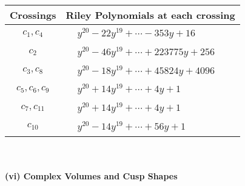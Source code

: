 \documentclass[1p]{elsarticle_modified}
\theoremstyle{definition}
\begin{document}
\begin{tabular}{m{50pt}|m{274pt}}
Crossings & \hspace{64pt}Riley Polynomials at each crossing \\
\hline $$\begin{aligned}c_{1},c_{4}\end{aligned}$$&$\begin{aligned}
&y^{20}-22 y^{19}+\cdots-353 y+16
\end{aligned}$\\
\hline $$\begin{aligned}c_{2}\end{aligned}$$&$\begin{aligned}
&y^{20}-46 y^{19}+\cdots+223775 y+256
\end{aligned}$\\
\hline $$\begin{aligned}c_{3},c_{8}\end{aligned}$$&$\begin{aligned}
&y^{20}-18 y^{19}+\cdots+45824 y+4096
\end{aligned}$\\
\hline $$\begin{aligned}c_{5},c_{6},c_{9}\end{aligned}$$&$\begin{aligned}
&y^{20}+14 y^{19}+\cdots+4 y+1
\end{aligned}$\\
\hline $$\begin{aligned}c_{7},c_{11}\end{aligned}$$&$\begin{aligned}
&y^{20}+14 y^{19}+\cdots+4 y+1
\end{aligned}$\\
\hline $$\begin{aligned}c_{10}\end{aligned}$$&$\begin{aligned}
&y^{20}-14 y^{19}+\cdots+56 y+1
\end{aligned}$\\
\hline
\end{tabular}\\~\\
\newpage\flushleft \textbf{(vi) Complex Volumes and Cusp Shapes}
\end{document}
